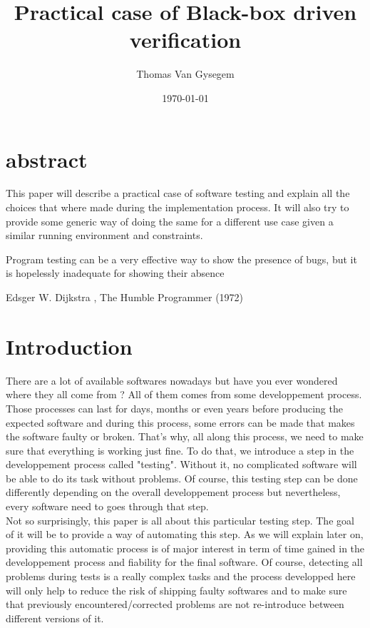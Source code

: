 \documentclass[12pt]{article}
\begin{document}
\title{Practical case of Black-box driven verification}
\author{Thomas Van Gysegem}
\date\today
\maketitle

\section*{abstract}

This paper will describe a practical case of software testing and explain all the choices that where made during the implementation process. It will also try to provide some generic way of doing the same for a different use case given a similar running environment and constraints.

\clearpage
\pagebreak
\hspace{0pt}
\vfill
\epigraph{Program testing can be a very effective way to show the presence of bugs, but it is hopelessly inadequate for showing their absence}{Edsger W. Dijkstra , The Humble Programmer (1972)}
\vfill
\hspace{0pt}
\pagebreak

\clearpage

\tableofcontents

\clearpage

\section{Introduction}

There are a lot of available softwares nowadays but have you ever wondered where they all come from ? All of them comes from some developpement process. Those processes can last for days, months or even years before producing the expected software and during this process, some errors can be made that makes the software faulty or broken. That's why, all along this process, we need to make sure that everything is working just fine. To do that, we introduce a step in the developpement process called "testing". Without it, no complicated software will be able to do its task without problems. Of course, this testing step can be done differently depending on the overall developpement process but nevertheless, every software need to goes through that step.\\

Not so surprisingly, this paper is all about this particular testing step. The goal of it will be to provide a way of automating this step. As we will explain later on, providing this automatic process is of major interest in term of time gained in the developpement process and fiability for the final software. Of course, detecting all problems during tests is a really complex tasks and the process developped here will only help to reduce the risk of shipping faulty softwares and to make sure that previously encountered/corrected problems are not re-introduce between different versions of it.\\
\end{document}

